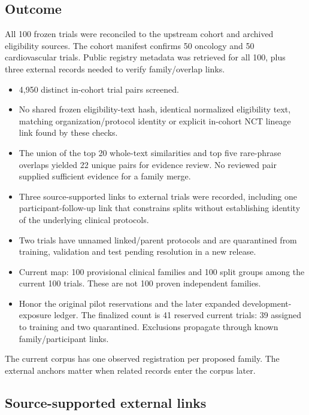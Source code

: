 \documentclass[10pt,letterpaper]{article}
\begin{document}
\subsection{Outcome}\label{audit-outcome}

All 100 frozen trials were reconciled to the upstream cohort and archived eligibility sources. The cohort manifest confirms 50 oncology and 50 cardiovascular trials. Public registry metadata was retrieved for all 100, plus three external records needed to verify family/overlap links.

\begin{itemize}
\item
  4,950 distinct in-cohort trial pairs screened.
\item
  No shared frozen eligibility-text hash, identical normalized eligibility text, matching organization/protocol identity or explicit in-cohort NCT lineage link found by these checks.
\item
  The union of the top 20 whole-text similarities and top five rare-phrase overlaps yielded 22 unique pairs for evidence review. No reviewed pair supplied sufficient evidence for a family merge.
\item
  Three source-supported links to external trials were recorded, including one participant-follow-up link that constrains splits without establishing identity of the underlying clinical protocols.
\item
  Two trials have unnamed linked/parent protocols and are quarantined from training, validation and test pending resolution in a new release.
\item
  Current map: 100 provisional clinical families and 100 split groups among the current 100 trials. These are not 100 proven independent families.
\item
  Honor the original pilot reservations and the later expanded development-exposure ledger. The finalized count is 41 reserved current trials: 39 assigned to training and two quarantined. Exclusions propagate through known family/participant links.
\end{itemize}

The current corpus has one observed registration per proposed family. The external anchors matter when related records enter the corpus later.

\subsection{Source-supported external links}\label{audit-source-supported-external-links}
\end{document}
